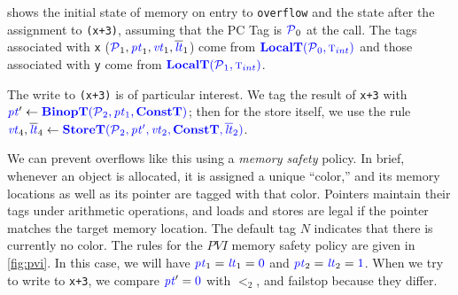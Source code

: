 \documentclass{llncs}
\begin{document}

 shows the initial state of memory on entry to {\tt overflow} and the state after
the assignment to {\tt *(x+3)}, assuming that the PC Tag is \(\PCT_0\) at the call. The tags associated
with {\tt x} (\(\PCT_1,\pt_1,\vt_1,\lts_1\)) come from \(\localtname(\PCT_0,\TN[int])\) and those
associated with {\tt y} come from \(\localtname(\PCT_1,\TN[int])\).

The write to {\tt *(x+3)} is of particular interest. We tag the result of {\tt x+3}
with \(\pt' \leftarrow \binoptname(\PCT_2, \pt_1, \constt)\); then for the store itself,
we use the rule \(\vt_4, \lts_4 \leftarrow \storetname(\PCT_2, \pt', \vt_2, \constt, \lts_2)\).

We can prevent overflows like this using a {\em memory safety} policy. In brief, whenever
an object is allocated, it is assigned a unique ``color,'' and its memory locations as well
as its pointer are tagged with that color. Pointers maintain their tags under arithmetic
operations, and loads and stores are legal if the pointer matches the target memory location.
The default tag \(N\) indicates that there is currently no color.
The rules for the \(PVI\) memory safety policy are given in \cref{fig:pvi}. In this case, we will
have \(\pt_1 = \lt_1 = \tagz\) and \(\pt_2 = \lt_2 = \tagone\). When we try to write to {\tt x+3},
we compare \(\pt' = \tagz\) with \(\lt_2\), and failstop because they differ.
\end{document}
